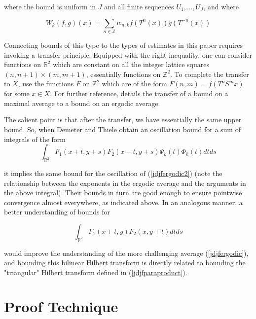 \documentclass[12pt]{article}
\begin{document}
\noindent where the bound is uniform in $J$ and all finite sequences $U_1, ..., U_J$, and where 

\begin{equation*}
W_k(f, g)(x)=\sum\limits_{n\in\mathbb{Z}}w_{n, k}f(T^n(x))g(T^{-n}(x)) 
\end{equation*}

Connecting bounds of this type to the types of estimates in this paper requires invoking a transfer principle. Equipped with the right inequality, one can consider functions on $\mathbb{R}^2$ which are constant on all the integer lattice squares $(n, n+1)\times(m, m+1)$, essentially functions on $\mathbb{Z}^2$. To complete the transfer to $X$, use the functions $F$ on $\mathbb{Z}^2$ which are of the form $F(n, m)=f(T^n S^mx)$ for some $x\in X$. For further reference, \cite{dlttjdjf} details the transfer of a bound on a maximal average to a bound on an ergodic average.

The salient point is that after the transfer, we have essentially the same upper bound. So, when Demeter and Thiele obtain an oscillation bound for a sum of integrals of the form 
\begin{equation*}
    \int_{\mathbb{R}^2} F_1(x + t, y + s) F_2(x -t, y+s) \Psi_k(t)\Phi_k(t) dtds
\end{equation*}

\noindent it implies the same bound for the oscillation of (\ref{jdjfergodic2}) (note the relationship between the exponents in the ergodic average and the arguments in the above integral). Their bounds in turn are good enough to ensure pointwise convergence almost everywhere, as indicated above. In an analogous manner, a better understanding of bounds for 

\begin{equation*}
    \int_{\mathbb{R}^2} F_1(x + t, y) F_2(x, y+t) dtds
\end{equation*}

\noindent would improve the understanding of the more challenging average (\ref{jdjfergodic}), and bounding this bilinear Hilbert transform is directly related to bounding the "triangular" Hilbert transform defined in (\ref{jdjfparaproduct}). 

\section{Proof Technique}
\end{document}
